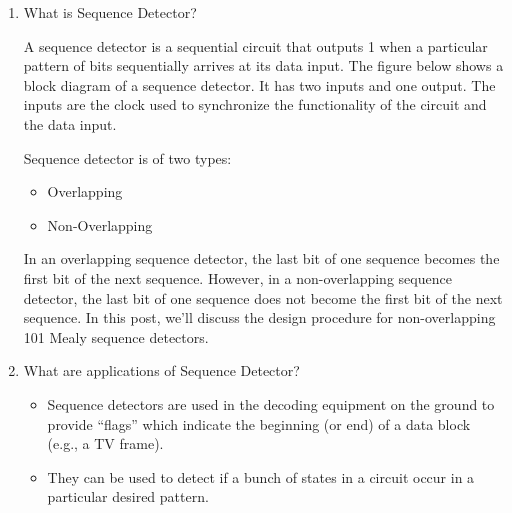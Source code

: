 \documentclass[11pt]{article}
\begin{document}
\begin{enumerate}
	\item What is Sequence Detector?
	
	A sequence detector is a sequential circuit that outputs 1 when a particular pattern of bits sequentially arrives at its data input. The figure below shows a block diagram of a sequence detector. It has two inputs and one output. The inputs are the clock used to synchronize the functionality of the circuit and the data input.

	Sequence detector is of two types: 
	\begin{itemize}
		\item Overlapping
		\item Non-Overlapping
	\end{itemize}	

	In an overlapping sequence detector, the last bit of one sequence becomes the first bit of the next sequence. However, in a non-overlapping sequence detector, the last bit of one sequence does not become the first bit of the next sequence. In this post, we’ll discuss the design procedure for non-overlapping 101 Mealy sequence detectors. 

	\item What are applications of Sequence Detector?
	
	\begin{itemize}
		\item Sequence detectors are used in the decoding equipment on the ground to provide “flags” which indicate the beginning (or end) of a data block (e.g., a TV frame).
		\item They can be used to detect if a bunch of states in a circuit occur in a particular desired pattern. 
	\end{itemize}

\end{enumerate}
\end{document}
